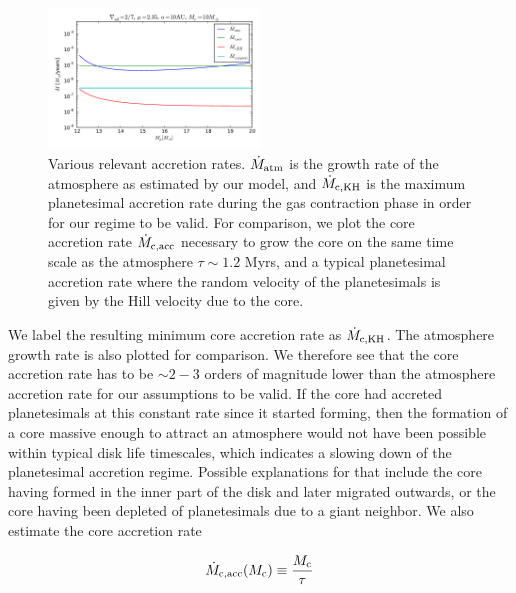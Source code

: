 \documentclass[apj]{emulateapj}
\begin{document}
 \begin{figure}[h]
\centering
\includegraphics[width=0.5\textwidth]{../../figs/ModelAtmospheres/RadSelfGravPoly/PaperFigs/acc_rates_poster.pdf}
\caption{Various relevant accretion rates. $\dot{M}_{\rm{atm}}$ is the growth rate of the atmosphere as estimated by our model, and $\dot{M}_{\rm{c,KH}}$ is the maximum planetesimal accretion rate during the gas contraction phase in order for our regime to be valid. For comparison, we plot the core accretion rate $\dot{M}_{\rm{c,acc}}$ necessary to grow the core on the same time scale as the atmosphere $\tau \sim 1.2$ Myrs, and a typical planetesimal accretion rate where the random velocity of the planetesimals is given by the Hill velocity due to the core.}
\end{figure}

We label the resulting minimum core accretion rate as $\dot{M}_{\rm{c,KH}}$. The atmosphere growth rate is also plotted for comparison. We therefore see that the core accretion rate has to be $\sim2-3$ orders of magnitude lower than the atmosphere accretion rate for our assumptions to be valid.  If the core had accreted planetesimals at this constant rate since it started forming, then the formation of a core massive enough to attract an atmosphere would not have been possible within typical disk life timescales, which indicates a slowing down of the planetesimal accretion regime. Possible explanations for that include the core having formed in the inner part of the disk and later migrated outwards, or the core having been depleted of planetesimals due to a giant neighbor. We also estimate the core accretion rate 

\begin{equation}
\label{eq:Mcdot}
\dot{M}_{\rm{c,acc}}(M_{\rm{c}}) \equiv \frac{M_{\rm{c}}}{\tau}
\end{equation}
\end{document}
